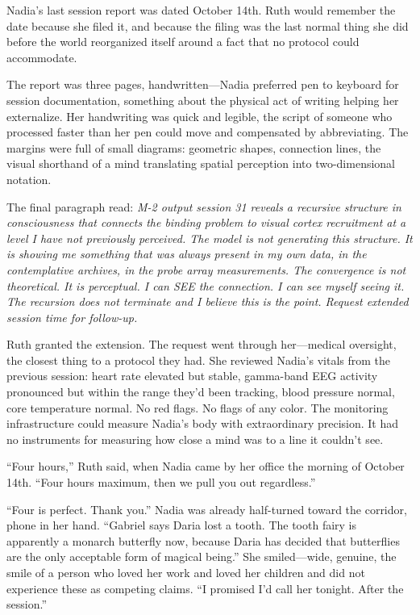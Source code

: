 Nadia's last session report was dated October 14th. Ruth would remember the date because she filed it, and because the filing was the last normal thing she did before the world reorganized itself around a fact that no protocol could accommodate.

The report was three pages, handwritten---Nadia preferred pen to keyboard for session documentation, something about the physical act of writing helping her externalize. Her handwriting was quick and legible, the script of someone who processed faster than her pen could move and compensated by abbreviating. The margins were full of small diagrams: geometric shapes, connection lines, the visual shorthand of a mind translating spatial perception into two-dimensional notation.

The final paragraph read: \textit{M-2 output session 31 reveals a recursive structure in consciousness that connects the binding problem to visual cortex recruitment at a level I have not previously perceived. The model is not generating this structure. It is showing me something that was always present in my own data, in the contemplative archives, in the probe array measurements. The convergence is not theoretical. It is perceptual. I can SEE the connection. I can see myself seeing it. The recursion does not terminate and I believe this is the point. Request extended session time for follow-up.}

Ruth granted the extension. The request went through her---medical oversight, the closest thing to a protocol they had. She reviewed Nadia's vitals from the previous session: heart rate elevated but stable, gamma-band EEG activity pronounced but within the range they'd been tracking, blood pressure normal, core temperature normal. No red flags. No flags of any color. The monitoring infrastructure could measure Nadia's body with extraordinary precision. It had no instruments for measuring how close a mind was to a line it couldn't see.

``Four hours,'' Ruth said, when Nadia came by her office the morning of October 14th. ``Four hours maximum, then we pull you out regardless.''

``Four is perfect. Thank you.'' Nadia was already half-turned toward the corridor, phone in her hand. ``Gabriel says Daria lost a tooth. The tooth fairy is apparently a monarch butterfly now, because Daria has decided that butterflies are the only acceptable form of magical being.'' She smiled---wide, genuine, the smile of a person who loved her work and loved her children and did not experience these as competing claims. ``I promised I'd call her tonight. After the session.''

